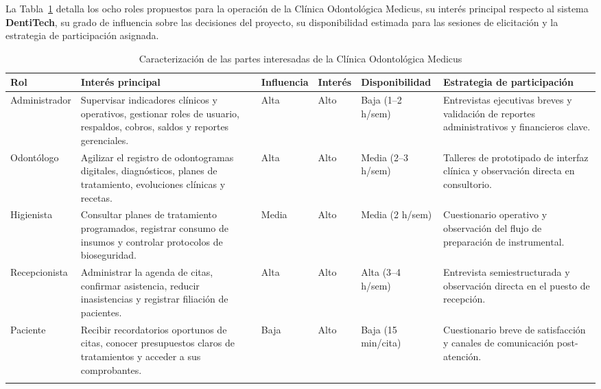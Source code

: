 \documentclass[12pt,a4paper]{article}
\begin{document}
La Tabla~\ref{tab:partes_interesadas} detalla los ocho roles propuestos para la operación de la Clínica Odontológica Medicus, su interés principal respecto al sistema \textbf{DentiTech}, su grado de influencia sobre las decisiones del proyecto, su disponibilidad estimada para las sesiones de elicitación y la estrategia de participación asignada.

\begin{table}[htbp]
\centering
\caption{Caracterización de las partes interesadas de la Clínica Odontológica Medicus}
\label{tab:partes_interesadas}
\begingroup
\scriptsize
\setlength{\tabcolsep}{3pt}
\renewcommand{\arraystretch}{1.18}
\begin{tabularx}{\textwidth}{
>{\raggedright\arraybackslash}p{1.65cm}
>{\raggedright\arraybackslash}X
>{\centering\arraybackslash}p{0.95cm}
>{\centering\arraybackslash}p{0.75cm}
>{\raggedright\arraybackslash}p{1.35cm}
>{\raggedright\arraybackslash}X}
\toprule
\textbf{Rol} & \textbf{Interés principal} & \textbf{Influencia} &
\textbf{Interés} & \textbf{Disponibilidad} &
\textbf{Estrategia de participación}\\
\midrule
Administrador &
Supervisar indicadores clínicos y operativos, gestionar roles de usuario, respaldos, cobros, saldos y reportes gerenciales. &
Alta & Alto & Baja (1--2 h/sem) &
Entrevistas ejecutivas breves y validación de reportes administrativos y financieros clave.\\
\addlinespace

Odontólogo &
Agilizar el registro de odontogramas digitales, diagnósticos, planes de tratamiento, evoluciones clínicas y recetas. &
Alta & Alto & Media (2--3 h/sem) &
Talleres de prototipado de interfaz clínica y observación directa en consultorio.\\
\addlinespace

Higienista &
Consultar planes de tratamiento programados, registrar consumo de insumos y controlar protocolos de bioseguridad. &
Media & Alto & Media (2 h/sem) &
Cuestionario operativo y observación del flujo de preparación de instrumental.\\
\addlinespace

Recepcionista &
Administrar la agenda de citas, confirmar asistencia, reducir inasistencias y registrar filiación de pacientes. &
Alta & Alto & Alta (3--4 h/sem) &
Entrevista semiestructurada y observación directa en el puesto de recepción.\\
\addlinespace

Paciente &
Recibir recordatorios oportunos de citas, conocer presupuestos claros de tratamientos y acceder a sus comprobantes. &
Baja & Alto & Baja (15 min/cita) &
Cuestionario breve de satisfacción y canales de comunicación post-atención.\\
\addlinespace


\end{tabularx}
\end{table}
\end{document}
